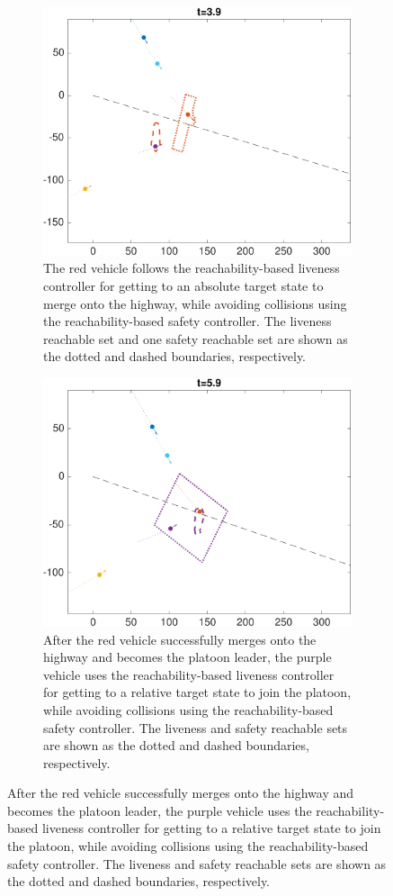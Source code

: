 \begin{figure} 
    \centering
    \begin{subfigure}[t]{0.45\textwidth} \label{subfig:fp_40}
        \includegraphics[width=\textwidth]{fig/fp_40}
        \caption{The red vehicle follows the reachability-based liveness controller for getting to an absolute target state to merge onto the highway, while avoiding collisions using the reachability-based safety controller. The liveness reachable set and one safety reachable set are shown as the dotted and dashed boundaries, respectively.}
    \end{subfigure}
    \begin{subfigure}[t]{0.45\textwidth} \label{subfig:fp_60}
        \includegraphics[width=\textwidth]{fig/fp_60}
        \caption{After the red vehicle successfully merges onto the highway and becomes the platoon leader, the purple vehicle uses the reachability-based liveness controller for getting to a relative target state to join the platoon, while avoiding collisions using the reachability-based safety controller. The liveness and safety reachable sets are shown as the dotted and dashed boundaries, respectively.}
    \end{subfigure}


\end{figure}
